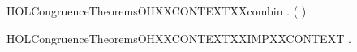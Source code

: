\newcommand{\HOLCongruenceTheoremsOHXXCONTEXTXXcases}{\UseVerbatim{HOLCongruenceTheoremsOHXXCONTEXTXXcases}}
\begin{SaveVerbatim}{HOLCongruenceTheoremsOHXXCONTEXTXXcombin}
\HOLTokenTurnstile{} \HOLSymConst{\HOLTokenForall{}} .   \HOLSymConst{\HOLTokenConj{}}   \HOLSymConst{\HOLTokenImp{}}  ( \HOLConst{\HOLTokenCompose} )
\end{SaveVerbatim}
\newcommand{\HOLCongruenceTheoremsOHXXCONTEXTXXcombin}{\UseVerbatim{HOLCongruenceTheoremsOHXXCONTEXTXXcombin}}
\begin{SaveVerbatim}{HOLCongruenceTheoremsOHXXCONTEXTXXIMPXXCONTEXT}
\HOLTokenTurnstile{} \HOLSymConst{\HOLTokenForall{}}.   \HOLSymConst{\HOLTokenImp{}}  
\end{SaveVerbatim}
\newcommand{\HOLCongruenceTheoremsOHXXCONTEXTXXIMPXXCONTEXT}{\UseVerbatim{HOLCongruenceTheoremsOHXXCONTEXTXXIMPXXCONTEXT}}

